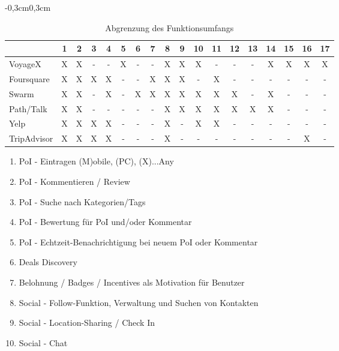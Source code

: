 	\begin{table}[H]
	\begin{adjustwidth}{-0,3cm}{0,3cm}
		\centering
		\begin{tabulary}{18cm}{|L|C|C|C|C|C|C|C|C|C|C|C|C|C|C|C|C|C|}
		\hline
			 & \textbf{1} & \textbf{2} & \textbf{3} & \textbf{4} & \textbf{5} & \textbf{6} & \textbf{7} & \textbf{8} & \textbf{9} & \textbf{10} & \textbf{11} & \textbf{12} & \textbf{13} & \textbf{14} & \textbf{15} & \textbf{16} & \textbf{17} \\ \hline
			VoyageX     & X & X & - & - & X & - & - & X & X & X & - & - & - & X & X & X & X \\ \hline
			Foursquare  & X & X & X & X & - & - & X & X & X & - & X & - & - & - & - & - & - \\ \hline
			Swarm	    & X & X & - & X & - & X & X & X & X & X & X & X & - & X & - & - & - \\ \hline
			Path/Talk 	& X & X & - & - & - & - & - & X & X & X & X & X & X & X & - & - & - \\ \hline
			Yelp        & X & X & X & X & - & - & - & X & - & X & X & - & - & - & - & - & - \\ \hline
			TripAdvisor & X & X & X & X & - & - & - & X & - & - & - & - & - & - & - & X & - \\ \hline
		\end{tabulary}
	\caption{Abgrenzung des Funktionsumfangs}{
\vspace{0.2cm}
\begin{enumerate}[labelwidth=0pt,leftmargin=39pt,noitemsep,topsep=0pt,parsep=0pt,partopsep=0pt]
\item PoI - Eintragen (M)obile, (PC), (X)...Any
\item PoI - Kommentieren / Review
\item PoI - Suche nach Kategorien/Tags
\item PoI - Bewertung für PoI und/oder Kommentar
\item PoI - Echtzeit-Benachrichtigung bei neuem PoI oder Kommentar
\item Deals Discovery 
\item Belohnung / Badges / Incentives als Motivation für Benutzer
\item Social - Follow-Funktion, Verwaltung und Suchen von Kontakten
\item Social - Location-Sharing / Check In
\item Social - Chat

\end{enumerate}}
\end{adjustwidth}
\end{table}
